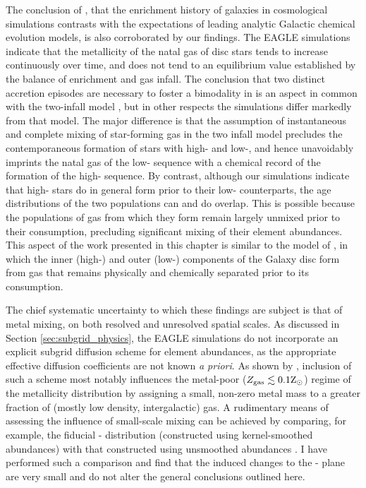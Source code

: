 The conclusion of \citet{2017arXiv170807834G}, that the enrichment history of galaxies in cosmological simulations contrasts with the expectations of leading analytic Galactic chemical evolution models, is also corroborated by our findings. The EAGLE simulations indicate that the metallicity of the natal gas of disc stars tends to increase continuously over time, and does not tend to an equilibrium value established by the balance of enrichment and gas infall. The conclusion that two distinct accretion episodes are necessary to foster a bimodality in \afe{} is an aspect in common with the \citet{1997ApJ...477..765C,2001ApJ...554.1044C} two-infall model \citep[see also][who arrived at similar conclusions by fitting empirical star formation histories to measurements of the SNIa delay time distribution]{2017ApJ...848...25M}, but in other respects the simulations differ markedly from that model. The major difference is that the assumption of instantaneous and complete mixing of star-forming gas in the two infall model precludes the contemporaneous formation of stars with high- and low-\afe{}, and hence unavoidably imprints the natal gas of the low-\afe{} sequence with a chemical record of the formation of the high-\afe{} sequence. By contrast, although our simulations indicate that high-\afe{} stars do in general form prior to their low-\afe{} counterparts, the age distributions of the two populations can and do overlap. This is possible because the populations of gas from which they form remain largely unmixed prior to their consumption, precluding significant mixing of their element abundances. This aspect of the work presented in this chapter is similar to the model of \citet{2013A&A...560A.109H,2015A&A...578A..87S}, in which the inner (high-\afe{}) and outer (low-\afe{}) components of the Galaxy disc form from gas that remains physically and chemically separated prior to its consumption.

The chief systematic uncertainty to which these findings are subject is that of metal mixing, on both resolved and unresolved spatial scales. As discussed in Section \ref{sec:subgrid_physics}, the EAGLE simulations do not incorporate an explicit subgrid diffusion scheme for element abundances, as the appropriate effective diffusion coefficients are not known \emph{a priori}. As shown by \citet[][see their Fig. 9]{2010MNRAS.407.1581S}, inclusion of such a scheme most notably influences the metal-poor  ($Z_{\rm gas} \lesssim 0.1 {\rm Z}_\odot$) regime of the metallicity distribution by assigning a small, non-zero metal mass to a greater fraction of (mostly low density, intergalactic) gas. A rudimentary means of assessing the influence of small-scale mixing can be achieved by comparing, for example, the fiducial \afe{}-\feh{} distribution (constructed using kernel-smoothed abundances) with that constructed using unsmoothed abundances \citep[see e.g. Appendix B of][]{2013MNRAS.432.3005C}. I have performed such a comparison and find that the induced changes to the \afe{}-\feh{} plane are very small and do not alter the general conclusions outlined here.

